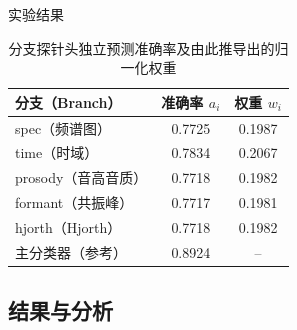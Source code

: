 \documentclass[aspectratio=169]{beamer}
\providecommand{\paragraph}[1]{\smallskip\textbf{#1}\par}
\begin{document}
\begin{frame}{实验结果}

\begin{table}[htbp]
\centering
\caption{分支探针头独立预测准确率及由此推导出的归一化权重}
\label{tab:probe-acc-weight}
\begin{tabular}{lcc}
\toprule
分支（Branch） & 准确率 $a_i$ & 权重 $w_i$ \\
\midrule
spec（频谱图）      & 0.7725 & 0.1987 \\
time（时域）        & 0.7834 & 0.2067 \\
prosody（音高音质） & 0.7718 & 0.1982 \\
formant（共振峰）   & 0.7717 & 0.1981 \\
hjorth（Hjorth）    & 0.7718 & 0.1982 \\
\midrule
主分类器（参考）    & 0.8924 & -- \\
\bottomrule
\end{tabular}
\end{table}
\end{frame}


\subsection{结果与分析}
%
%
%
\end{document}
